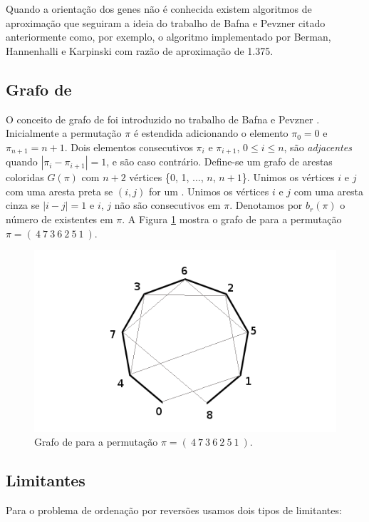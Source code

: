 Quando a orientação dos genes não é conhecida existem algoritmos de
aproximação que seguiram a ideia do trabalho de Bafna e Pevzner citado
anteriormente como, por exemplo, o algoritmo implementado por Berman,
Hannenhalli e Karpinski \cite{BermanHannenhalliKarpinski*2002} com
razão de aproximação de 1.375.

\subsection{Grafo de \bkp{}}
\label{subsec:rev_bkp}
O conceito de grafo de \bkp{} foi introduzido no trabalho de Bafna e
Pevzner \cite{BafnaPevzner*1996}. Inicialmente a permutação $\pi$ é
estendida adicionando o elemento $\pi_{0} = 0$ e $\pi_{n+1} =
n+1$. Dois elementos consecutivos $\pi_{i}$ e $\pi_{i+1}$, $0 \le
i \le n$, são \textit{adjacentes} quando $|\pi_{i} - \pi_{i+1}| = 1$,
e são  caso contrário. Define-se um grafo de arestas
coloridas $G(\pi)$ com $n + 2$ vértices \{0, 1, $\ldots$, $n$, $n +
1$\}. Unimos os vértices $i$ e $j$ com uma aresta preta se $(i, j)$
for um . Unimos os vértices $i$ e $j$ com uma aresta
cinza se $|i - j| = 1$ e $i$, $j$ não são consecutivos em
$\pi$. Denotamos por $b_r(\pi)$ o número de \bkp{} existentes em
$\pi$. A Figura \ref{fig:rev_grafo_bkp} mostra o grafo de \bkp{} para
a permutação $\pi = (~4~7~3~6~2~5~1~)$.

\begin{figure}[h]
  \centering 
  \includegraphics[scale=0.5]{images/rev_grafo_bkp.png} 
  \caption{Grafo de \bkp{} para a permutação $\pi = (~4~7~3~6~2~5~1~)$.}
  \label{fig:rev_grafo_bkp}
\end{figure}

\subsection{Limitantes}
\label{subsec:rev_limitantes}
Para o problema de ordenação por reversões usamos dois tipos de limitantes:

